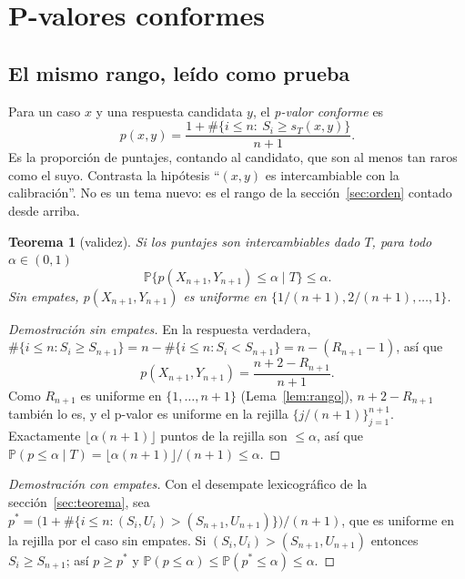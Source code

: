 \documentclass[11pt]{article}
\theoremstyle{plain}
\newtheorem{teorema}{Teorema}[section]
\theoremstyle{definition}
\theoremstyle{remark}
\newcommand{\Prob}{\mathbb P}
\newcommand{\lamina}[1]{}%
\begin{document}
\section{P-valores conformes}\label{sec:pvalores}\lamina{30}
\subsection{El mismo rango, leído como prueba}
Para un caso $x$ y una respuesta candidata $y$, el \emph{p-valor conforme} es
\[
 p(x,y)=\frac{1+\#\{i\le n:\ S_i\ge s_T(x,y)\}}{n+1}.
\]
Es la proporción de puntajes, contando al candidato, que son al menos tan raros como el suyo. Contrasta
la hipótesis ``$(x,y)$ es intercambiable con la calibración''. No es un tema nuevo: es el rango de la
sección~\ref{sec:orden} contado desde arriba.

\begin{teorema}[validez]\label{teo:pvalor}
Si los puntajes son intercambiables dado $T$, para todo $\alpha\in(0,1)$
\[
 \Prob\{p(X_{n+1},Y_{n+1})\le\alpha\mid T\}\le\alpha .
\]
Sin empates, $p(X_{n+1},Y_{n+1})$ es uniforme en $\{1/(n+1),2/(n+1),\dots,1\}$.
\end{teorema}
\begin{proof}[Demostración sin empates]
En la respuesta verdadera, $\#\{i\le n: S_i\ge S_{n+1}\}=n-\#\{i\le n:S_i<S_{n+1}\}=n-(R_{n+1}-1)$, así
que
\[
 p(X_{n+1},Y_{n+1})=\frac{n+2-R_{n+1}}{n+1}.
\]
Como $R_{n+1}$ es uniforme en $\{1,\dots,n+1\}$ (Lema~\ref{lem:rango}), $n+2-R_{n+1}$ también lo es, y
el p-valor es uniforme en la rejilla $\{j/(n+1)\}_{j=1}^{n+1}$. Exactamente $\lfloor\alpha(n+1)\rfloor$
puntos de la rejilla son $\le\alpha$, así que
$\Prob(p\le\alpha\mid T)=\lfloor\alpha(n+1)\rfloor/(n+1)\le\alpha$.
\end{proof}
\begin{proof}[Demostración con empates]
Con el desempate lexicográfico de la sección~\ref{sec:teorema}, sea
$p^*=\bigl(1+\#\{i\le n:(S_i,U_i)>(S_{n+1},U_{n+1})\}\bigr)/(n+1)$, que es uniforme en la rejilla por
el caso sin empates. Si $(S_i,U_i)>(S_{n+1},U_{n+1})$ entonces $S_i\ge S_{n+1}$; así $p\ge p^*$ y
$\Prob(p\le\alpha)\le\Prob(p^*\le\alpha)\le\alpha$.
\end{proof}
\end{document}

